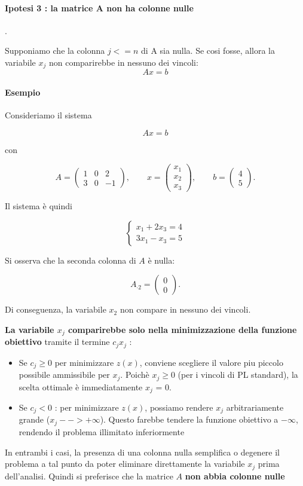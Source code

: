 \paragraph{Ipotesi 3 : la matrice A non ha colonne nulle}. 


Supponiamo che la colonna $j <= n$ di A sia nulla.
Se cosi fosse, allora la variabile $x_j$ non comparirebbe in nessuno dei vincoli:
\begin{equation}
    Ax = b
\end{equation}
\paragraph{Esempio}

Consideriamo il sistema

\[
A x = b
\]

con

\[
A =
\begin{pmatrix}
1 & 0 & 2 \\
3 & 0 & -1
\end{pmatrix},
\qquad
x =
\begin{pmatrix}
x_1 \\ x_2 \\ x_3
\end{pmatrix},
\qquad
b =
\begin{pmatrix}
4 \\ 5
\end{pmatrix}.
\]

Il sistema è quindi

\[
\begin{cases}
x_1 + 2x_3 = 4 \\
3x_1 - x_3 = 5
\end{cases}
\]

Si osserva che la seconda colonna di $A$ è nulla:

\[
A_{\cdot 2} =
\begin{pmatrix}
0 \\ 0
\end{pmatrix}.
\]

Di conseguenza, la variabile $x_2$ non compare in nessuno dei vincoli.

\textbf{La variabile $x_j$ comparirebbe solo nella minimizzazione della funzione obiettivo} tramite il termine $c_jx_j$ :
\begin{itemize}
    \item Se \textbf{$c_j \geq 0$} per minimizzare $z(x)$, conviene scegliere il valore piu piccolo possibile ammissibile per $x_j$.
    Poichè $x_j \geq 0$ (per i vincoli di PL standard), la scelta ottimale è immediatamente $x_j$ = 0.
    \item Se \textbf{$c_j < 0$} : per minimizzare $z(x)$, possiamo rendere $x_j$ arbitrariamente grande ($x_j --> + \infty $).
    Questo farebbe tendere la funzione obiettivo a $-\infty$, rendendo il problema illimitato inferiormente
\end{itemize}
In entrambi i casi, la presenza di una colonna nulla semplifica o degenere il problema a tal punto da poter eliminare direttamente la variabile $x_j$ prima dell'analisi. 
Quindi si preferisce che la matrice $A$ \textbf{non abbia colonne nulle}


